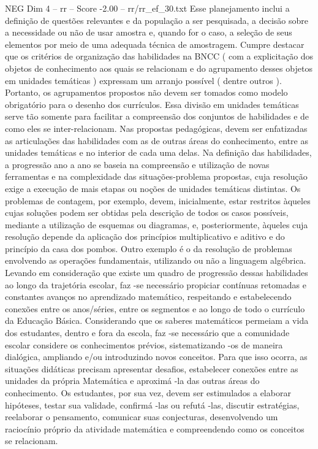 \begin{textsample}{NEG Dim 4 – rr – Score -2.00 – rr/rr\_ef\_30.txt}
Esse planejamento inclui a definição de questões relevantes e da população a ser pesquisada, a decisão sobre a necessidade ou não de usar amostra e, quando for o caso, a seleção de seus elementos por meio de uma adequada técnica de amostragem.
Cumpre destacar que os critérios de organização das habilidades na BNCC ( com a explicitação dos objetos de conhecimento aos quais se relacionam e do agrupamento desses objetos em unidades temáticas ) expressam um arranjo possível ( dentre outros ).
Portanto, os agrupamentos propostos não devem ser tomados como modelo obrigatório para o desenho dos currículos.
Essa divisão em unidades temáticas serve tão somente para facilitar a compreensão dos conjuntos de habilidades e de como eles se inter-relacionam.
Nas propostas pedagógicas, devem ser enfatizadas as articulações das habilidades com as de outras áreas do conhecimento, entre as unidades temáticas e no interior de cada uma delas.
Na definição das habilidades, a progressão ano a ano se baseia na compreensão e utilização de novas ferramentas e na complexidade das situações-problema propostas, cuja resolução exige a execução de mais etapas ou noções de unidades temáticas distintas.
Os problemas de contagem, por exemplo, devem, inicialmente, estar restritos àqueles cujas soluções podem ser obtidas pela descrição de todos os casos possíveis, mediante a utilização de esquemas ou diagramas, e, posteriormente, àqueles cuja resolução depende da aplicação dos princípios multiplicativo e aditivo e do princípio da casa dos pombos.
Outro exemplo é o da resolução de problemas envolvendo as operações fundamentais, utilizando ou não a linguagem algébrica.
Levando em consideração que existe um quadro de progressão dessas habilidades ao longo da trajetória escolar, faz -se necessário propiciar contínuas retomadas e constantes avanços no aprendizado matemático, respeitando e estabelecendo conexões entre os anos/séries, entre os segmentos e ao longo de todo o currículo da Educação Básica.
Considerando que os saberes matemáticos permeiam a vida dos estudantes, dentro e fora da escola, faz -se necessário que a comunidade escolar considere os conhecimentos prévios, sistematizando -os de maneira dialógica, ampliando e/ou introduzindo novos conceitos.
Para que isso ocorra, as situações didáticas precisam apresentar desafios, estabelecer conexões entre as unidades da própria Matemática e aproximá -la das outras áreas do conhecimento.
Os estudantes, por sua vez, devem ser estimulados a elaborar hipóteses, testar sua validade, confirmá -las ou refutá -las, discutir estratégias, reelaborar o pensamento, comunicar suas conjecturas, desenvolvendo um raciocínio próprio da atividade matemática e compreendendo como os conceitos se relacionam.

\end{textsample}
